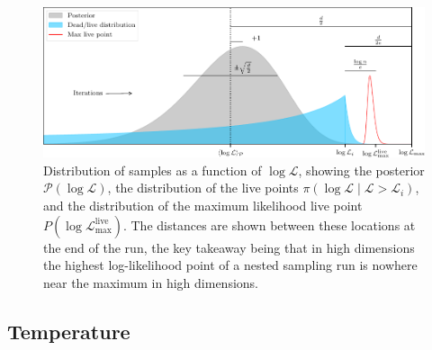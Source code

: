 \documentclass[usenatbib]{mnras}
\begin{document}
\begin{figure}
\begin{center}
    \includegraphics{figures/logL_distribution.pdf}
\end{center}
\caption{Distribution of samples as a function of $\log\mathcal{L}$, showing the posterior $\mathcal{P}(\log\mathcal{L})$, the distribution of the live points $\mathcal{\pi}(\log\mathcal{L} \mid \mathcal{L}>\mathcal{L}_i)$, and the distribution of the maximum likelihood live point $P(\log\mathcal{L}_\mathrm{max}^\mathrm{live})$. The distances are shown between these locations at the end of the run, the key takeaway being that in high dimensions the highest log-likelihood point of a nested sampling run is nowhere near the maximum in high dimensions.}
\label{fig:logL_distribution}
\end{figure}


\subsection{Temperature}\label{sec:temperature}
\end{document}
